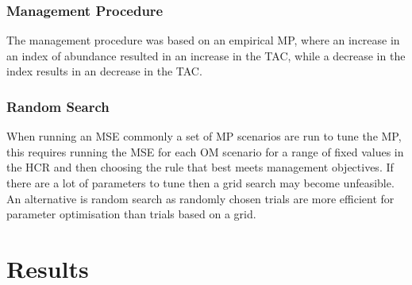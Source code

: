 \documentclass[preprint,12pt]{elsarticle}
\begin{document}
\subsubsection{Management Procedure}

The management procedure was based on an empirical MP, where an increase in an index of abundance resulted in an increase in the TAC, while a decrease in the index results in an decrease in the TAC.

\subsubsection{Random Search}


When running an MSE commonly a set of MP scenarios are run to tune the MP, this requires running the MSE for each OM scenario for a range of fixed values in the HCR and then choosing the rule that best meets management objectives. If there are a lot of parameters to tune then a grid search may become unfeasible. An alternative is random search \cite{bergstra2012random} as randomly chosen trials are more efficient for parameter optimisation than trials based on a grid. 

  
\section{Results}
\end{document}
